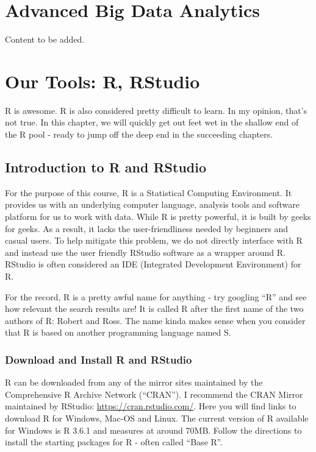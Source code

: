 \documentclass[
]{krantz}
\begin{document}
\hypertarget{advanced-big-data-analytics}{%
\chapter{Advanced Big Data Analytics}\label{advanced-big-data-analytics}}

Content to be added.

\hypertarget{our-tools-r-rstudio}{%
\chapter{Our Tools: R, RStudio}\label{our-tools-r-rstudio}}

R is awesome. R is also considered pretty difficult to learn. In my opinion, that's not true. In this chapter, we will quickly get out feet wet in the shallow end of the R pool - ready to jump off the deep end in the succeeding chapters.

\hypertarget{introduction-to-r-and-rstudio}{%
\section{Introduction to R and RStudio}\label{introduction-to-r-and-rstudio}}

For the purpose of this course, R is a Statistical Computing Environment. It provides us with an underlying computer language, analysis tools and software platform for us to work with data. While R is pretty powerful, it is built by geeks for geeks. As a result, it lacks the user-friendliness needed by beginners and casual users. To help mitigate this problem, we do not directly interface with R and instead use the user friendly RStudio software as a wrapper around R. RStudio is often considered an IDE (Integrated Development Environment) for R.

For the record, R is a pretty awful name for anything - try googling ``R'' and see how relevant the search results are! It is called R after the first name of the two authors of R: Robert and Ross. The name kinda makes sense when you consider that R is based on another programming language named S.

\hypertarget{download-and-install-r-and-rstudio}{%
\subsection{Download and Install R and RStudio}\label{download-and-install-r-and-rstudio}}

R can be downloaded from any of the mirror sites maintained by the Comprehensive R Archive Network (``CRAN''). I recommend the CRAN Mirror maintained by RStudio: \url{https://cran.rstudio.com/}. Here you will find links to download R for Windows, Mac-OS and Linux. The current version of R available for Windows is R 3.6.1 and measures at around 70MB. Follow the directions to install the starting packages for R - often called ``Base R''.
\end{document}
